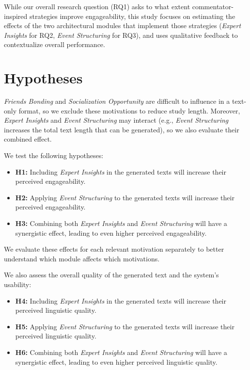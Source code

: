 While our overall research question (RQ1) asks to what extent commentator-inspired strategies improve engageability, this study focuses on estimating the effects of the two architectural modules that implement those strategies (\textit{Expert Insights} for RQ2, \textit{Event Structuring} for RQ3), and uses qualitative feedback to contextualize overall performance.

\section{Hypotheses}
\label{sec:hypotheses}
\textit{Friends Bonding} and \textit{Socialization Opportunity} are difficult to influence in a text-only format, so we exclude these motivations to reduce study length. Moreover, \textit{Expert Insights} and \textit{Event Structuring} may interact (e.g., \textit{Event Structuring} increases the total text length that can be generated), so we also evaluate their combined effect.

We test the following hypotheses:

\begin{itemize}[noitemsep,topsep=0pt]
  \item \textbf{H1:} Including \textit{Expert Insights} in the generated texts will increase their perceived engageability.
  \item \textbf{H2:} Applying \textit{Event Structuring} to the generated texts will increase their perceived engageability.
  \item \textbf{H3:} Combining both \textit{Expert Insights} and \textit{Event Structuring} will have a synergistic effect, leading to even higher perceived engageability.
\end{itemize}

We evaluate these effects for each relevant motivation separately to better understand which module affects which motivations.

We also assess the overall quality of the generated text and the system's usability:
\begin{itemize}[noitemsep,topsep=0pt]
  \item \textbf{H4:} Including \textit{Expert Insights} in the generated texts will increase their perceived linguistic quality.
  \item \textbf{H5:} Applying \textit{Event Structuring} to the generated texts will increase their perceived linguistic quality.
  \item \textbf{H6:} Combining both \textit{Expert Insights} and \textit{Event Structuring} will have a synergistic effect, leading to even higher perceived linguistic quality.
\end{itemize}

